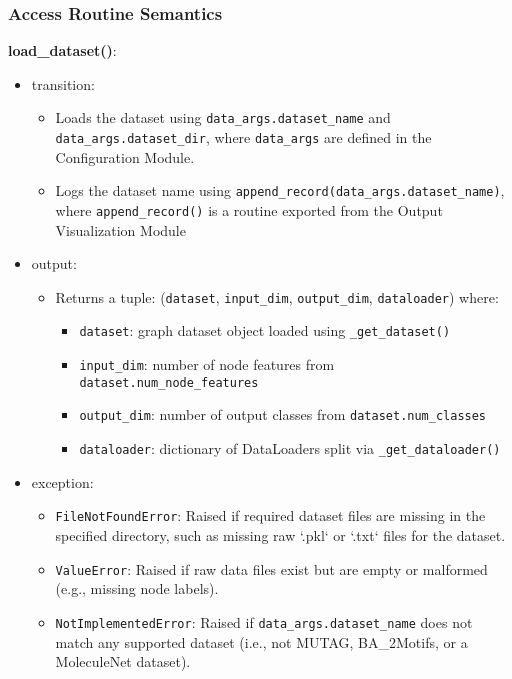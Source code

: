 \documentclass[12pt, titlepage]{article}
\begin{document}
\subsubsection{Access Routine Semantics}

\noindent \textbf{load\_dataset()}:
\begin{itemize}
  \item transition:
  \begin{itemize}
    \item Loads the dataset using \texttt{data\_args.dataset\_name} and \texttt{data\_args.dataset\_dir}, where \texttt{data\_args} are defined in the Configuration Module.
    \item Logs the dataset name using \texttt{append\_record(data\_args.dataset\_name)}, where \texttt{append\_record()} is a routine exported from the Output Visualization Module
  \end{itemize}
  \item output:
  \begin{itemize}
    \item Returns a tuple: (\texttt{dataset}, \texttt{input\_dim}, \texttt{output\_dim}, \texttt{dataloader}) where:
    \begin{itemize}
      \item \texttt{dataset}: graph dataset object loaded using \texttt{\_get\_dataset()}
      \item \texttt{input\_dim}: number of node features from \texttt{dataset.num\_node\_features}
      \item \texttt{output\_dim}: number of output classes from \texttt{dataset.num\_classes}
      \item \texttt{dataloader}: dictionary of DataLoaders split via \texttt{\_get\_dataloader()}
    \end{itemize}
  \end{itemize}
    \item exception:
    \begin{itemize}
      \item \texttt{FileNotFoundError}: 
      Raised if required dataset files are missing in the specified directory, such as missing raw `.pkl` or `.txt` files for the dataset.
      
      \item \texttt{ValueError}: 
      Raised if raw data files exist but are empty or malformed (e.g., missing node labels).
    
      \item \texttt{NotImplementedError}: 
      Raised if \texttt{data\_args.dataset\_name} does not match any supported dataset (i.e., not MUTAG, BA\_2Motifs, or a MoleculeNet dataset).
    \end{itemize}
\end{itemize}
\end{document}
